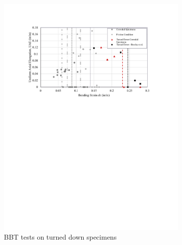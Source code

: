 \begin{itemize}
\begin{figure}[htbp]
	\centering
	\includegraphics[width=0.84\textwidth]{VAC Thesis 2.0/Chapter-4/figs/Results_BBT_TurnedDown.pdf}
	\caption{BBT tests on turned down specimens}
	\label{fig:TurnedDown_BBT_tests_ch7}
\end{figure}
    
\end{itemize}
